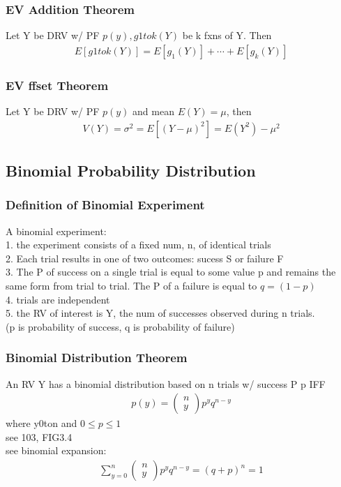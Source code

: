 \documentclass[12pt]{article}
\begin{document}
    \subsubsection{EV Addition Theorem}
        Let Y be DRV w/ PF $ p(y), g1tok(Y) $ be k fxns of Y. Then
        \begin{align*}
            E[g1tok(Y)] = E[g_{1}(Y)] + \cdots + E[g_{k}(Y)]
        \end{align*}
    \subsubsection{EV ffset Theorem}
        Let Y be DRV w/ PF $ p(y) $ and mean $ E(Y) = \mu  $, then
        \begin{align*}
            V(Y) = \sigma ^2 = E[(Y - \mu )^2 ] = E(Y^2 ) - \mu ^2 
        \end{align*}
\subsection{Binomial Probability Distribution}
    \subsubsection{Definition of Binomial Experiment}
        A binomial experiment:\\
        1. the experiment consists of a fixed num, n, of identical trials\\
        2. Each trial results in one of two outcomes:
        sucess S or failure F\\
        3. The P of success on a single trial is equal to some value p and
        remains the same form from trial to trial. The P of a failure is 
        equal to $ q = (1-p) $\\
        4. trials are independent\\
        5. the RV of interest is Y, the num of successes observed during
        n trials.\\
        (p is probability of success, q is probability of failure)
    \subsubsection{Binomial Distribution Theorem}
        An RV Y has a binomial distribution based on n trials w/ 
        success P p IFF
        \begin{align*}
            p(y) = \begin{pmatrix}n\\y\end{pmatrix}p^yq^{n-y}
        \end{align*}
        where y0ton and $ 0 \le p \le 1 $\\
        see 103, FIG3.4\\
        see binomial expansion:
        \begin{align*}
            \sum_{y=0}^{n} \begin{pmatrix}n\\y\end{pmatrix}
            p^yq^{n-y} = (q+ p)^{n} = 1
        \end{align*}
\end{document}
